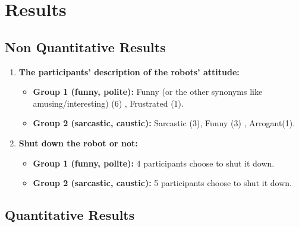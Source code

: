 \documentclass[conference]{IEEEtran}
\begin{document}
\section{Results}


\begin{comment}

\textcolor{red}{\textbf{THIS IS A SHARED PART.}}


\textcolor{blue}{A succinct report on the results of the taken measures. Please report the results in a neutral 
way without interpreting then in this section. Your interpretation of the results should follow in 
the Discussion Section of the report.\\
 - For any quantitative measures, please include a statistical analysis.\\
 - For qualitative measures, include an overview of comments that were made by the 
participants, e.g. in any post study interviews}

\end{comment}

\subsection{Non Quantitative Results}



\begin{enumerate}
    \item \textbf{The participants' description of the robots' attitude:}
    \begin{itemize}
    \item \textbf{Group 1 (funny, polite):} Funny (or the other synonyms like amusing/interesting) (6) , Frustrated (1).
    \item \textbf{Group 2 (sarcastic, caustic):} Sarcastic (3), Funny (3) , Arrogant(1). 
    \end{itemize}
    \item \textbf{Shut down the robot or not:}
    \begin{itemize}
    \item \textbf{Group 1 (funny, polite):} 4 participants choose to shut it down.
    \item \textbf{Group 2 (sarcastic, caustic):} 5 participants choose to shut it down. 
    \end{itemize}
\end{enumerate}

\subsection{Quantitative Results}
\end{document}
